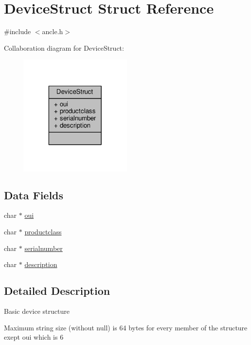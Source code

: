 \hypertarget{structDeviceStruct}{\section{Device\-Struct Struct Reference}
\label{structDeviceStruct}
}


{\ttfamily \#include $<$ancle.\-h$>$}



Collaboration diagram for Device\-Struct\-:\nopagebreak
\begin{figure}[H]
\begin{center}
\leavevmode
\includegraphics[width=160pt]{structDeviceStruct__coll__graph}
\end{center}
\end{figure}
\subsection*{Data Fields}
\begin{DoxyCompactItemize}
\item 
char $\ast$ \hyperlink{structDeviceStruct_ae8bec302b6b5c6d0a0fe1e64e4a45a37}{oui}
\item 
char $\ast$ \hyperlink{structDeviceStruct_a8411736ff451abaad5414e3dca6e671b}{productclass}
\item 
char $\ast$ \hyperlink{structDeviceStruct_a3d613c2cae19aac655b22ca3958ba601}{serialnumber}
\item 
char $\ast$ \hyperlink{structDeviceStruct_a7c6bdc123c89125b52aa347b0ef0d436}{description}
\end{DoxyCompactItemize}


\subsection{Detailed Description}
Basic device structure

Maximum string size (without null) is 64 bytes for every member of the structure exept oui which is 6 

